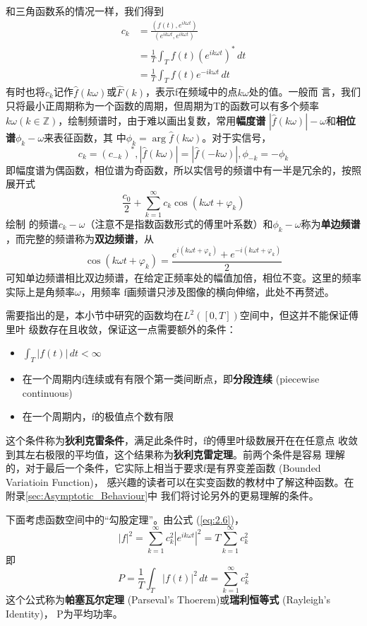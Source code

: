 \documentclass{ctexbook}
\begin{document}
和三角函数系的情况一样，我们得到
\begin{align*}
    c_k & =\frac{(f(t),e^{ik\omega t})}{(e^{ik\omega t},e^{ik\omega t})} \\
        & =\frac{1}{T}\int_{T}f(t)(e^{ik\omega t})^*\,dt                 \\
        & =\frac{1}{T}\int_{T}f(t)e^{-ik\omega t}\,dt
\end{align*}
有时也将$c_k$记作$\hat{f}(k\omega)$或$\hat{F}(k)$，表示f在频域中的点$k\omega$处的值。一般而
言，我们只将最小正周期称为一个函数的周期，但周期为T的函数可以有多个频率
$k\omega(k \in \mathbb{Z})$，绘制频谱时，由于难以画出复数，常用\textbf{幅度谱}
$|\hat{f}(k\omega)|-\omega$和\textbf{相位谱}$\phi_k-\omega$来表征函数，其
中$\phi_k=\arg\hat{f}(k\omega)$。对于实信号，
\[c_k=(c_{-k})^*,|\hat{f}(k\omega)|=|\hat{f}(-k\omega)|,\phi_{-k}=-\phi_k\]
即幅度谱为偶函数，相位谱为奇函数，所以实信号的频谱中有一半是冗余的，按照展开式
\[\frac{c_0}{2}+\sum_{k = 1}^{\infty} c_k\cos(k\omega t+\varphi _k)\]绘制
的频谱$c_k-\omega$（注意不是指数函数形式的傅里叶系数）和$\phi_k-\omega$称为\textbf{单边频谱}
，而完整的频谱称为\textbf{双边频谱}，从
\[\cos(k\omega t+\varphi _k)=\frac{e^{i(k\omega t+\varphi_k)}+e^{-i(k\omega t+\varphi_k)}}{2}\]
可知单边频谱相比双边频谱，在给定正频率处的幅值加倍，相位不变。这里的频率实际上是角频率$\omega$，用频率
f画频谱只涉及图像的横向伸缩，此处不再赘述。

需要指出的是，本小节中研究的函数均在$L^2([0,T])$空间中，但这并不能保证傅里叶
级数存在且收敛，保证这一点需要额外的条件：
\begin{itemize}[nosep, left=0pt]
    \item $\int_{T}|f(t)|\,dt<\infty$
    \item 在一个周期内f连续或有有限个第一类间断点，即\textbf{分段连续} (piecewise continuous)
    \item 在一个周期内，f的极值点个数有限
\end{itemize}
这个条件称为\textbf{狄利克雷条件}，满足此条件时，f的傅里叶级数展开在在任意点
收敛到其左右极限的平均值，这个结果称为\textbf{狄利克雷定理}。前两个条件是容易
理解的，对于最后一个条件，它实际上相当于要求f是有界变差函数 (Bounded Variatioin Function)，
感兴趣的读者可以在实变函数的教材中了解这种函数。在附录\ref{sec:Asymptotic_Behaviour}中
我们将讨论另外的更易理解的条件。

下面考虑函数空间中的“勾股定理”。由公式 (\ref{eq:2.6})，
\[|f|^2=\sum_{k=1}^{\infty}c_k^2|e^{ik\omega t}|^2=T\sum_{k=1}^{\infty}c_k^2\]
即\[P=\frac{1}{T}\int_{T}|f(t)|^2\,dt=\sum_{k=1}^{\infty}c_k^2\]
这个公式称为\textbf{帕塞瓦尔定理} (Parseval's Thoerem)或\textbf{瑞利恒等式} (Rayleigh's Identity)，
P为平均功率。
\end{document}
